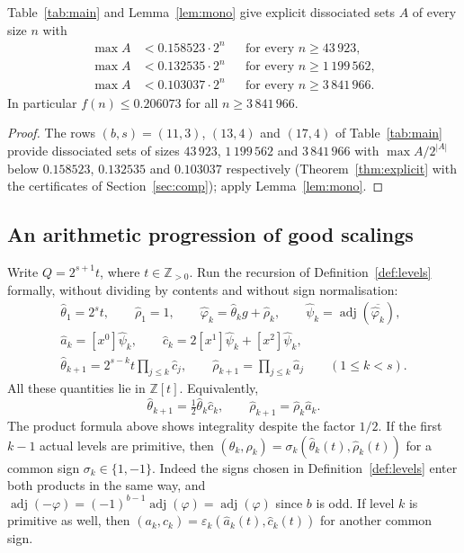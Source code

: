 \documentclass[12pt]{article}
\newcommand{\Z}{\mathbb{Z}}
\newcommand{\adj}{\operatorname{adj}}
\newcommand{\gpoly}{g}
\begin{document}
\begin{corollary}\label{cor:alln}
Table~\ref{tab:main} and Lemma~\ref{lem:mono} give explicit dissociated sets $A$ of every size $n$ with
\begin{align*}
\max A&<0.158523\cdot2^{n}&&\text{for every } n\ge43\,923,\\
\max A&<0.132535\cdot2^{n}&&\text{for every } n\ge1\,199\,562,\\
\max A&<0.103037\cdot2^{n}&&\text{for every } n\ge3\,841\,966.
\end{align*}
In particular $f(n)\le0.206073$ for all $n\ge3\,841\,966$.
\end{corollary}
\begin{proof}
The rows $(b,s)=(11,3)$, $(13,4)$ and $(17,4)$ of Table~\ref{tab:main} provide dissociated sets of sizes $43\,923$,
$1\,199\,562$ and $3\,841\,966$ with $\max A/2^{|A|}$ below $0.158523$, $0.132535$ and $0.103037$ respectively
(Theorem~\ref{thm:explicit} with the certificates of Section~\ref{sec:comp}); apply Lemma~\ref{lem:mono}.
\end{proof}

\subsection{An arithmetic progression of good scalings}\label{sec:AP}
Write $Q=2^{s+1}t$, where $t\in\Z_{>0}$. Run the recursion of Definition~\ref{def:levels}
formally, without dividing by contents and without sign normalisation:
\begin{gather*}
\hat\theta_1=2^st,\qquad \hat\rho_1=1,\qquad
\hat\varphi_k=\hat\theta_k\gpoly+\hat\rho_k,\qquad
\hat\psi_k=\adj(\overline{\hat\varphi_k}),\\
\hat a_k=[x^0]\hat\psi_k,\qquad
\hat c_k=2[x^1]\hat\psi_k+[x^2]\hat\psi_k,\\
\hat\theta_{k+1}=2^{s-k}t\prod_{j\le k}\hat c_j,\qquad
\hat\rho_{k+1}=\prod_{j\le k}\hat a_j\qquad(1\le k<s).
\end{gather*}
All these quantities lie in $\Z[t]$. Equivalently,
\begin{equation}\label{eq:formal-step}
\hat\theta_{k+1}=\tfrac12\hat\theta_k\hat c_k,\qquad
\hat\rho_{k+1}=\hat\rho_k\hat a_k.
\end{equation}
The product formula above shows integrality despite the factor $1/2$.
If the first $k-1$ actual levels are primitive, then
$(\theta_k,\rho_k)=\sigma_k(\hat\theta_k(t),\hat\rho_k(t))$ for a common sign
$\sigma_k\in\{1,-1\}$. Indeed the signs chosen in Definition~\ref{def:levels} enter
both products in the same way, and
$\adj(-\varphi)=(-1)^{b-1}\adj(\varphi)=\adj(\varphi)$ since $b$ is odd.
If level $k$ is primitive as well, then
$(a_k,c_k)=\varepsilon_k(\hat a_k(t),\hat c_k(t))$ for another common sign.
\end{document}
